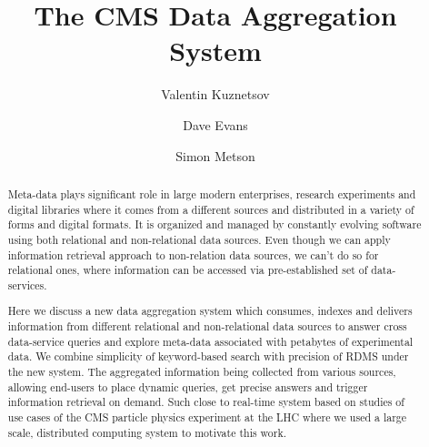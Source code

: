 \documentclass[1p,times]{elsarticle}
\begin{document}
\begin{frontmatter}



\dochead{}

\title{The CMS Data Aggregation System}


\author[vkuznet]{Valentin Kuznetsov}
\address[vkuznet]{Cornell University, Ithaca, New York, USA}

\author[evans]{Dave Evans}
\address[evans]{Fermilab, Batavia, Illinois, USA}

\author[metson]{Simon Metson}
\address[metson]{Bristol University, Bristol, UK}


\begin{abstract}
Meta-data plays significant role in large modern enterprises, 
research experiments and digital libraries where it comes from a different 
sources and distributed in a variety of forms and digital formats. 
It is organized and managed by constantly evolving software using 
both relational and non-relational data sources. Even though we can apply
information retrieval approach to non-relation data sources,
we can't do so for relational ones, where information can be accessed via
pre-established set of data-services.

Here we discuss a new data aggregation system which consumes, 
indexes and delivers information from different relational and 
non-relational data sources to answer cross data-service queries 
and explore meta-data associated with petabytes of experimental data. 
We combine simplicity of keyword-based search with precision of RDMS
under the new system. The aggregated information being collected from various sources,
allowing end-users to place dynamic queries, get precise answers and 
trigger information retrieval on demand. Such close to real-time system 
based on studies  of use cases of the CMS particle physics experiment at 
the LHC where we used a large scale, distributed computing system 
to motivate this work.
\end{abstract}


\end{frontmatter}
\end{document}
